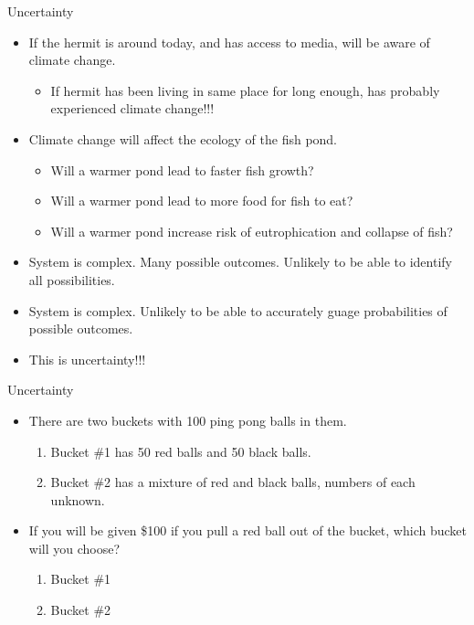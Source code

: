\begin{frame}{Uncertainty}
	\begin{itemize}
		\item If the hermit is around today, and has access to media, will be aware of climate change.
		\begin{itemize}
			\item If hermit has been living in same place for long enough, has probably experienced climate change!!!
		\end{itemize}
		\item Climate change will affect the ecology of the fish pond.
		\begin{itemize}
			\item Will a warmer pond lead to faster fish growth?
			\item Will a warmer pond lead to more food for fish to eat?
			\item Will a warmer pond increase risk of eutrophication and collapse of fish?
		\end{itemize}
		\item System is complex.  Many possible outcomes.  Unlikely to be able to identify all possibilities.
		\item System is complex.  Unlikely to be able to accurately guage probabilities of possible outcomes.
		\item This is uncertainty!!!
	\end{itemize}
\end{frame}

\begin{frame}{Uncertainty}
	\begin{itemize}
		\item There are two buckets with 100 ping pong balls in them.
		\begin{enumerate}
			\item Bucket \#1 has 50 red balls and 50 black balls.
			\item Bucket \#2 has a mixture of red and black balls, numbers of each unknown.
		\end{enumerate}
		\item If you will be given \$100 if you pull a red ball out of the bucket, which bucket will you choose?
		\begin{enumerate}
			\item Bucket \#1
			\item Bucket \#2
		\end{enumerate}
	\end{itemize}
\end{frame}

